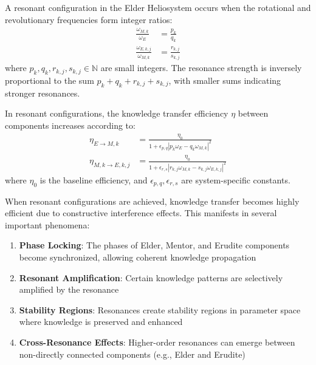\begin{definition}
A resonant configuration in the Elder Heliosystem occurs when the rotational and revolutionary frequencies form integer ratios:
\begin{align}
\frac{\omega_{M,k}}{\omega_E} &= \frac{p_k}{q_k}\\
\frac{\omega_{E,k,j}}{\omega_{M,k}} &= \frac{r_{k,j}}{s_{k,j}}
\end{align}
where $p_k, q_k, r_{k,j}, s_{k,j} \in \mathbb{N}$ are small integers. The resonance strength is inversely proportional to the sum $p_k + q_k + r_{k,j} + s_{k,j}$, with smaller sums indicating stronger resonances.
\end{definition}

\begin{theorem}
In resonant configurations, the knowledge transfer efficiency $\eta$ between components increases according to:
\begin{align}
\eta_{E \rightarrow M,k} &= \frac{\eta_0}{1 + \epsilon_{p,q}|p_k\omega_E - q_k\omega_{M,k}|^2}\\
\eta_{M,k \rightarrow E,k,j} &= \frac{\eta_0}{1 + \epsilon_{r,s}|r_{k,j}\omega_{M,k} - s_{k,j}\omega_{E,k,j}|^2}
\end{align}
where $\eta_0$ is the baseline efficiency, and $\epsilon_{p,q}, \epsilon_{r,s}$ are system-specific constants.
\end{theorem}

When resonant configurations are achieved, knowledge transfer becomes highly efficient due to constructive interference effects. This manifests in several important phenomena:

\begin{enumerate}
    \item \textbf{Phase Locking}: The phases of Elder, Mentor, and Erudite components become synchronized, allowing coherent knowledge propagation
    \item \textbf{Resonant Amplification}: Certain knowledge patterns are selectively amplified by the resonance
    \item \textbf{Stability Regions}: Resonances create stability regions in parameter space where knowledge is preserved and enhanced
    \item \textbf{Cross-Resonance Effects}: Higher-order resonances can emerge between non-directly connected components (e.g., Elder and Erudite)
\end{enumerate}

